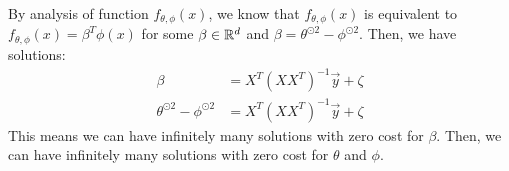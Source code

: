 \begin{answer}
    By analysis of function $f_{\theta,\phi}(x)$, we know that $f_{\theta,\phi}(x)$ is equivalent to 
    $f_{\theta,\phi}(x) = \beta^T \phi(x)$ for some $\beta \in \mathbb{R}^d$ and 
    $\beta = \theta^{\odot2} - \phi^{\odot2}$.
    Then, we have solutions:
    \begin{align*}
        \beta &= X^T (XX^T)^{-1} \vec{y} + \zeta \\
        \theta^{\odot2} - \phi^{\odot2} &= X^T (XX^T)^{-1} \vec{y} + \zeta
    \end{align*}
    This means we can have infinitely many solutions with zero cost for $\beta$.
    Then, we can have infinitely many solutions with zero cost for $\theta$ and $\phi$.
\end{answer}